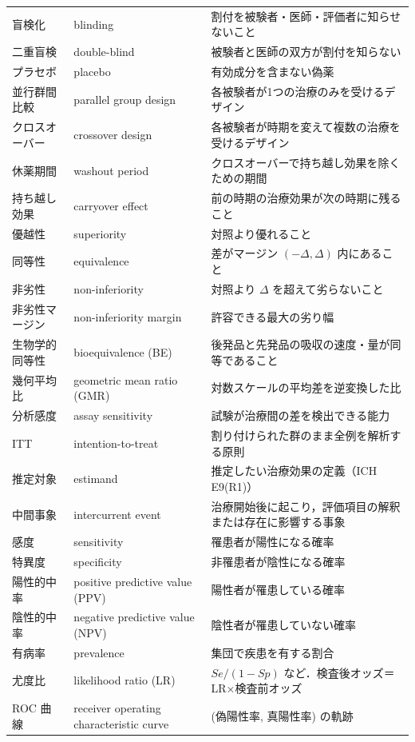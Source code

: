 \documentclass[a4paper,11pt,openany]{ltjsbook}
\begin{document}
\begin{center}
\begin{longtable}{@{}L{32mm}L{40mm}L{78mm}@{}}
盲検化 & blinding & 割付を被験者・医師・評価者に知らせないこと\\
二重盲検 & double-blind & 被験者と医師の双方が割付を知らない\\
プラセボ & placebo & 有効成分を含まない偽薬\\
並行群間比較 & parallel group design & 各被験者が1つの治療のみを受けるデザイン\\
クロスオーバー & crossover design & 各被験者が時期を変えて複数の治療を受けるデザイン\\
休薬期間 & washout period & クロスオーバーで持ち越し効果を除くための期間\\
持ち越し効果 & carryover effect & 前の時期の治療効果が次の時期に残ること\\
優越性 & superiority & 対照より優れること\\
同等性 & equivalence & 差がマージン $(-\Delta,\Delta)$ 内にあること\\
非劣性 & non-inferiority & 対照より $\Delta$ を超えて劣らないこと\\
非劣性マージン & non-inferiority margin & 許容できる最大の劣り幅\\
生物学的同等性 & bioequivalence (BE) & 後発品と先発品の吸収の速度・量が同等であること\\
幾何平均比 & geometric mean ratio (GMR) & 対数スケールの平均差を逆変換した比\\
分析感度 & assay sensitivity & 試験が治療間の差を検出できる能力\\
ITT & intention-to-treat & 割り付けられた群のまま全例を解析する原則\\
推定対象 & estimand & 推定したい治療効果の定義（ICH E9(R1)）\\
中間事象 & intercurrent event & 治療開始後に起こり，評価項目の解釈または存在に影響する事象\\
感度 & sensitivity & 罹患者が陽性になる確率\\
特異度 & specificity & 非罹患者が陰性になる確率\\
陽性的中率 & positive predictive value (PPV) & 陽性者が罹患している確率\\
陰性的中率 & negative predictive value (NPV) & 陰性者が罹患していない確率\\
有病率 & prevalence & 集団で疾患を有する割合\\
尤度比 & likelihood ratio (LR) & $Se/(1-Sp)$ など．検査後オッズ＝LR×検査前オッズ\\
ROC 曲線 & receiver operating characteristic curve & (偽陽性率, 真陽性率) の軌跡\\

\end{longtable}
\end{center}
\end{document}
